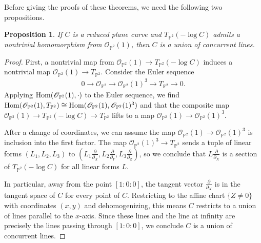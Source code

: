 \documentclass[11pt,reqno]{amsart}
\theoremstyle{plain}
\newtheorem{proposition}[theorem]{Proposition}
\theoremstyle{definition}
\theoremstyle{remark}
\numberwithin{equation}{section}
\renewcommand{\to}{{\longrightarrow}}
\numberwithin{equation}{section}
\newcommand{\OO}{\mathscr{O}}
\newcommand{\PP}{\mathbb{P}}
\begin{document}
Before giving the proofs of these theorems, we need the following two propositions.

\begin{proposition}
\label{O1vectorfield}
If $C$ is a reduced plane curve and $T_{\PP^2}(-\log C)$ admits a nontrivial homomorphism from $\OO_{\PP^2}(1)$, then $C$ is a union of concurrent lines.
\end{proposition}

\begin{proof}
First, a nontrivial map from $\OO_{\PP^2}(1)\to T_{\PP^2}(-\log C)$ induces a nontrivial map $\OO_{\PP^2}(1)\to T_{\PP^2}$. Consider the Euler sequence
\begin{align*}
    0\to \OO_{\PP^2}\to \OO_{\PP^2}(1)^3\to T_{\PP^2} \to 0.
\end{align*}
Applying $\Hom(\OO_{\PP^2}(1),\cdot)$ to the Euler sequence, we find $\Hom(\OO_{\PP^2}(1),T_{\PP^2})\cong \Hom(\OO_{\PP^2}(1),\OO_{\PP^2}(1)^3)$ and that the composite map $\OO_{\PP^2}(1)\to T_{\PP^2}(-\log C) \to T_{\PP^2}$ lifts to a map $\OO_{\PP^2}(1)\to \OO_{\PP^2}(1)^3$.

After a change of coordinates, we can assume the map $\OO_{\PP^2}(1)\to \OO_{\PP^2}(1)^3$ is inclusion into the first factor.
The map $\OO_{\PP^2}(1)^3\to T_{\PP^2}$ sends a tuple of linear forms $(L_1,L_2,L_3)$ to $(L_1\frac{\partial}{\partial_X},L_2\frac{\partial}{\partial_Y},L_3\frac{\partial}{\partial_Z})$, so we conclude that $L\frac{\partial}{\partial_X}$ is a section of $T_{\PP^2}(-\log C)$ for all linear forms $L$.

In particular, away from the point $[1:0:0]$, the tangent vector $\frac{\partial}{\partial_X}$ is in the tangent space of $C$ for every point of $C$. Restricting to the affine chart $\{Z\neq 0\}$ with coordinates $(x,y)$ and dehomogenizing, this means $C$ restricts to a union of lines parallel to the $x$-axis. Since these lines and the line at infinity are precisely the lines passing through $[1:0:0]$, we conclude $C$ is a union of concurrent lines.
\end{proof}
\end{document}
